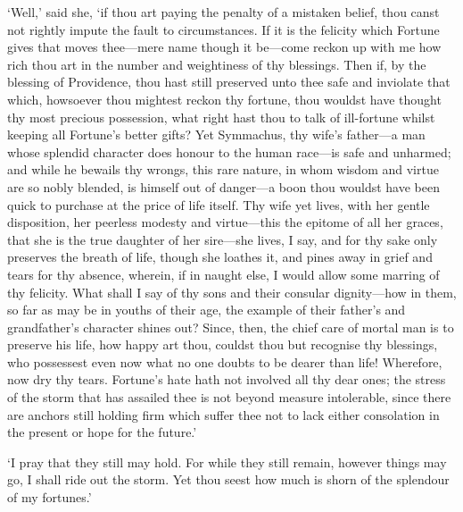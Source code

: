 \documentclass[11pt]{book}
\begin{document}
`Well,' said she, `if thou art paying the penalty of a mistaken belief,
thou canst not rightly impute the fault to circumstances. If it is the
felicity which Fortune gives that moves thee---mere name though it
be---come reckon up with me how rich thou art in the number and
weightiness of thy blessings. Then if, by the blessing of Providence,
thou hast still preserved unto thee safe and inviolate that which,
howsoever thou mightest reckon thy fortune, thou wouldst have thought
thy most precious possession, what right hast thou to talk of
ill-fortune whilst keeping all Fortune's better gifts? Yet Symmachus,
thy wife's father---a man whose splendid character does honour to the
human race---is safe and unharmed; and while he bewails thy wrongs, this
rare nature, in whom wisdom and virtue are so nobly blended, is himself
out of danger---a boon thou wouldst have been quick to purchase at the
price of life itself. Thy wife yet lives, with her gentle disposition,
her peerless modesty and virtue---this the epitome of all her graces,
that she is the true daughter of her sire---she lives, I say, and for thy
sake only preserves the breath of life, though she loathes it, and pines
away in grief and tears for thy absence, where\-in, if in naught else, I
would allow some marring of thy felicity. What shall I say of thy sons
and their consular dignity---how in them, so far as may be in youths of
their age, the example of their father's and grandfather's character
shines out? Since, then, the chief care of mortal man is to preserve his
life, how happy art thou, couldst thou but recognise thy blessings, who
possessest even now what no one doubts to be dearer than life!
Wherefore, now dry thy tears. Fortune's hate hath not involved all thy
dear ones; the stress of the storm that has assailed thee is not beyond
measure intolerable, since there are anchors still holding firm which
suffer thee not to lack either consolation in the present or hope for
the future.'

`I pray that they still may hold. For while they still remain, however
things may go, I shall ride out the storm. Yet thou seest how much is
shorn of the splendour of my fortunes.'
\end{document}
